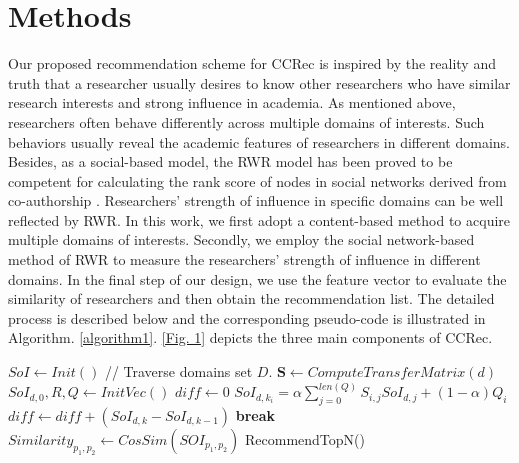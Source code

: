 \documentclass[10pt]{article}
\newcommand{\algorithmicbreak}{\textbf{break}}
\newcommand{\BREAK}{\State \algorithmicbreak}
\begin{document}
\section*{Methods}
Our proposed recommendation scheme for CCRec is inspired by the reality and truth that a researcher usually desires to know other researchers who have similar research interests and strong influence in academia. As mentioned above, researchers often behave differently across multiple domains of interests. Such behaviors usually reveal the academic features of researchers in different domains. Besides, as a social-based model, the RWR model has been proved to be competent for calculating the rank score of nodes in social networks derived from co-authorship \cite{li2014acrec}. Researchers' strength of influence in specific domains can be well reflected by RWR. In this work, we first adopt a content-based method to acquire multiple domains of interests. Secondly, we employ the social network-based method of RWR to measure the researchers' strength of influence in different domains. In the final step of our design, we use the feature vector to evaluate the similarity of researchers and then obtain the recommendation list. The detailed process is described below and the corresponding pseudo-code is illustrated in Algorithm. \ref{algorithm1}. \autoref{Fig. 1} depicts the three main components of CCRec.

\begin{algorithm}[!hbt]
  \label{algorithm1}
  \begin{algorithmic}[1]
  \State $SoI \leftarrow Init()$
   // Traverse domains set $D$.
        \State $\mathbf{S} \leftarrow ComputeTransferMatrix(d)$
        \State $SoI_{d,0}, R, Q \leftarrow InitVec()$
            \State $diff \leftarrow 0$
                \State $SoI_{d,k_{i}} = \alpha\sum_{j=0}^{len(Q)} S_{i,j}SoI_{d,j}+(1-\alpha) Q_{i}$
                \State $diff \leftarrow diff +(SoI_{d,k}-SoI_{d,k-1})$
            \EndFor
                \BREAK
            \EndIf
        \EndFor
  \EndFor
            \State $Similarity_{p_{1},p_{2}} \leftarrow CosSim(SOI_{p_{1},p_{2}})$
        \EndFor
  \EndFor
  \State RecommendTopN()
  \end{algorithmic}
\end{algorithm}
\end{document}
